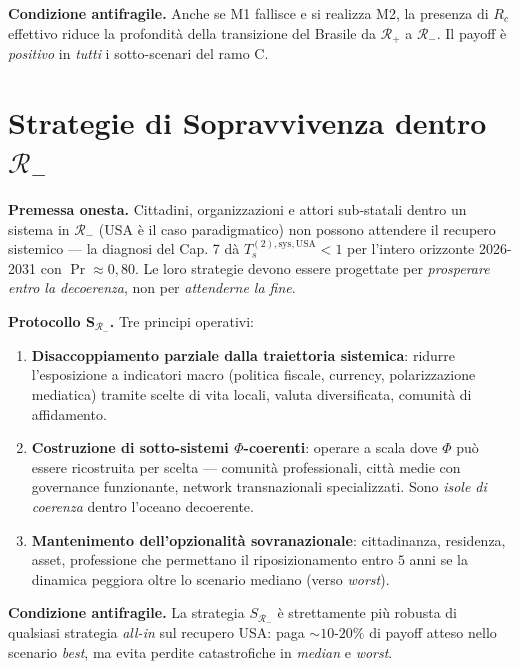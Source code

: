 \Proved{} \textbf{Condizione antifragile.} Anche se M1 fallisce e si
realizza M2, la presenza di \(R_c\) effettivo riduce la profondità della
transizione del Brasile da \(\mathcal{R}_+\) a \(\mathcal{R}_-\). Il
payoff è \emph{positivo} in \emph{tutti} i sotto-scenari del ramo C.



\section{\texorpdfstring{Strategie di Sopravvivenza dentro
\(\mathcal{R}_-\)}{Strategie di Sopravvivenza dentro \textbackslash mathcal\{R\}\_-}}\label{strategie-di-sopravvivenza-dentro-mathcalr_-}

\Hypoth{} \textbf{Premessa onesta.} Cittadini, organizzazioni e attori
sub-statali dentro un sistema in \(\mathcal{R}_-\) (USA è il caso
paradigmatico) non possono attendere il recupero sistemico --- la
diagnosi del Cap. 7 dà \(T_s^{(2),\text{sys},\text{USA}} < 1\) per
l'intero orizzonte 2026-2031 con \(\Pr \approx 0{,}80\). Le loro
strategie devono essere progettate per \emph{prosperare entro la
decoerenza}, non per \emph{attenderne la fine}.

\Hypoth{} \textbf{Protocollo S\(_{\mathcal{R}_-}\).} Tre principi
operativi:

\begin{enumerate}
\def\labelenumi{\arabic{enumi}.}
\tightlist
\item
  \textbf{Disaccoppiamento parziale dalla traiettoria sistemica}:
  ridurre l'esposizione a indicatori macro (politica fiscale, currency,
  polarizzazione mediatica) tramite scelte di vita locali, valuta
  diversificata, comunità di affidamento.
\item
  \textbf{Costruzione di sotto-sistemi \(\Phi\)-coerenti}: operare a
  scala dove \(\Phi\) può essere ricostruita per scelta --- comunità
  professionali, città medie con governance funzionante, network
  transnazionali specializzati. Sono \emph{isole di coerenza} dentro
  l'oceano decoerente.
\item
  \textbf{Mantenimento dell'opzionalità sovranazionale}: cittadinanza,
  residenza, asset, professione che permettano il riposizionamento entro
  \(5\) anni se la dinamica peggiora oltre lo scenario mediano (verso
  \emph{worst}).
\end{enumerate}

\Proved{} \textbf{Condizione antifragile.} La strategia
\(S_{\mathcal{R}_-}\) è strettamente più robusta di qualsiasi strategia
\emph{all-in} sul recupero USA: paga \(\sim 10\)-\(20\%\) di payoff
atteso nello scenario \emph{best}, ma evita perdite catastrofiche in
\emph{median} e \emph{worst}.



